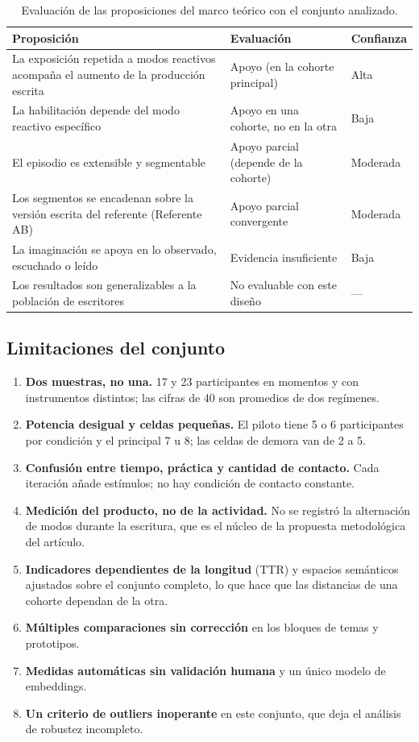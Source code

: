 \documentclass[12pt]{article}
\begin{document}
\begin{table}[htbp]
	\centering
	\caption{Evaluación de las proposiciones del marco teórico con el conjunto analizado.}
	\label{tab:matriz_combinado}
	\small
	\begin{tabular}{p{} p{} p{}}
		\toprule
		\textbf{Proposición} & \textbf{Evaluación} & \textbf{Confianza} \\
		\midrule
		La exposición repetida a modos reactivos acompaña el aumento de la producción escrita &
		Apoyo (en la cohorte principal) & Alta \\[2pt]
		La habilitación depende del modo reactivo específico &
		Apoyo en una cohorte, no en la otra & Baja \\[2pt]
		El episodio es extensible y segmentable &
		Apoyo parcial (depende de la cohorte) & Moderada \\[2pt]
		Los segmentos se encadenan sobre la versión escrita del referente (Referente AB) &
		Apoyo parcial convergente & Moderada \\[2pt]
		La imaginación se apoya en lo observado, escuchado o leído &
		Evidencia insuficiente & Baja \\[2pt]
		Los resultados son generalizables a la población de escritores &
		No evaluable con este diseño & --- \\
		\bottomrule
	\end{tabular}
\end{table}

\subsection{Limitaciones del conjunto}

\begin{enumerate}
	\item \textbf{Dos muestras, no una.} 17 y 23 participantes en momentos y con instrumentos
	distintos; las cifras de 40 son promedios de dos regímenes.
	\item \textbf{Potencia desigual y celdas pequeñas.} El piloto tiene 5 o 6 participantes por
	condición y el principal 7 u 8; las celdas de demora van de 2 a 5.
	\item \textbf{Confusión entre tiempo, práctica y cantidad de contacto.} Cada iteración añade
	estímulos; no hay condición de contacto constante.
	\item \textbf{Medición del producto, no de la actividad.} No se registró la alternación de
	modos durante la escritura, que es el núcleo de la propuesta metodológica del artículo.
	\item \textbf{Indicadores dependientes de la longitud} (TTR) y espacios semánticos ajustados
	sobre el conjunto completo, lo que hace que las distancias de una cohorte dependan de la otra.
	\item \textbf{Múltiples comparaciones sin corrección} en los bloques de temas y prototipos.
	\item \textbf{Medidas automáticas sin validación humana} y un único modelo de embeddings.
	\item \textbf{Un criterio de outliers inoperante} en este conjunto, que deja el análisis de
	robustez incompleto.
\end{enumerate}
\end{document}
